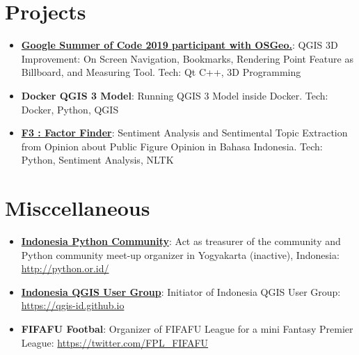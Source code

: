 \documentclass[letterpaper,11pt]{article}
\newcommand{\resumeItem}[2]{
  \item\small{
    \textbf{#1}{: #2 \vspace{-2pt}}
  }
}
\newcommand{\resumeSubItem}[2]{\resumeItem{#1}{#2}\vspace{-4pt}}
\newcommand{\resumeSubHeadingListStart}{\begin{itemize}[leftmargin=*]}
\newcommand{\resumeSubHeadingListEnd}{\end{itemize}}
\begin{document}
\section{Projects}
  \resumeSubHeadingListStart
    \resumeSubItem{\href{https://ismailsunni.github.io/GSoC-2019/}{Google Summer of Code 2019 participant with OSGeo.}}
      {QGIS 3D Improvement: On Screen Navigation, Bookmarks, Rendering Point Feature as Billboard, and Measuring Tool. Tech: Qt C++, 3D Programming}
    \resumeSubItem{Docker QGIS 3 Model}
      {Running QGIS 3 Model inside Docker. Tech: Docker, Python, QGIS}
    \resumeSubItem{\href{https://github.com/ismailsunni/f3-factor-finder}{F3 : Factor Finder}}
      {Sentiment Analysis and Sentimental Topic Extraction from Opinion about Public Figure Opinion in Bahasa Indonesia. Tech: Python, Sentiment Analysis, NLTK}
  \resumeSubHeadingListEnd

\section{Misccellaneous}
  \resumeSubHeadingListStart
    \resumeSubItem{\href{http://python.or.id/}{Indonesia Python Community}}
      {Act as treasurer of the community and Python community meet-up organizer in Yogyakarta (inactive), Indonesia: \url{http://python.or.id/}}
    \resumeSubItem{\href{https://qgis-id.github.io}{Indonesia QGIS User Group}}
      {Initiator of Indonesia QGIS User Group: \url{https://qgis-id.github.io}}
    \resumeSubItem{FIFAFU Footbal}
      {Organizer of FIFAFU League for a mini Fantasy Premier League: \url{https://twitter.com/FPL_FIFAFU}}
  \resumeSubHeadingListEnd




\end{document}

